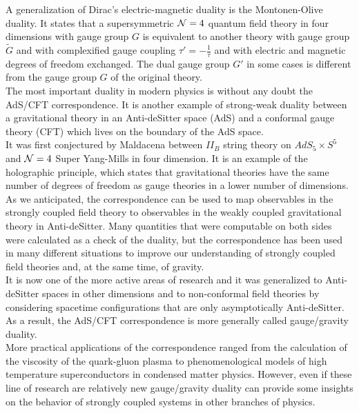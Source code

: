 A generalization of Dirac's electric-magnetic duality is the Montonen-Olive duality.
It states that a supersymmetric  $\mathcal{N}=4$ quantum field theory in four dimensions with gauge group $G$ is equivalent to another theory with gauge group $\tilde{G}$ and with complexified gauge coupling $\tau' = - \frac{1}{\tau}$ and with electric and magnetic degrees of freedom exchanged.
The dual gauge group $G'$ in some cases is different from the gauge group $G$ of the original theory.
\\

The most important duality in modern physics is without any doubt the AdS/CFT correspondence. 
It is another example of strong-weak duality between a gravitational theory in an Anti-deSitter space (AdS) and a conformal gauge theory (CFT) which lives on the boundary of the AdS space. \\
It was first conjectured by Maldacena between $II_B$ string theory on $AdS_5 \times S^5$ and $\mathcal{N}=4$ Super Yang-Mills in four dimension. 
It is an example of the holographic principle, which states that gravitational theories have the same number of degrees of freedom as gauge theories in a lower number of dimensions.\\
As we anticipated, the correspondence can be used to map observables in the strongly coupled field theory to observables in the weakly coupled gravitational theory in Anti-deSitter.
Many quantities that were computable on both sides were calculated as a check of the duality, but the correspondence has been used in many different situations to improve our understanding of strongly coupled field theories and, at the same time, of gravity. \\
It is now one of the more active areas of research and it was generalized to  Anti-deSitter spaces in other dimensions and to non-conformal field theories by considering spacetime configurations that are only asymptotically Anti-deSitter.
As a result, the AdS/CFT correspondence is more generally called gauge/gravity duality.  \\
More practical applications of the correspondence ranged from the calculation of the viscosity of the quark-gluon plasma to phenomenological models of high temperature superconductors in condensed matter physics.
However, even if these line of research are relatively new gauge/gravity duality can provide some insights on the behavior of strongly coupled systems in other branches of physics.   
\\ 

